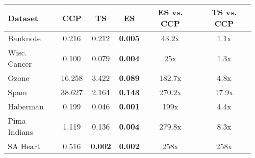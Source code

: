 \begin{tabular}{lccccc}
\toprule
Dataset & CCP & TS & ES & ES vs. CCP & TS vs. CCP \\
\midrule
Banknote & 0.216 & 0.212 & \textbf{0.005} & 43.2x & 1.1x \\
Wisc. Cancer & 0.100 & 0.079 & \textbf{0.004} & 25x & 1.3x \\
Ozone & 16.258 & 3.422 & \textbf{0.089} & 182.7x & 4.8x \\
Spam & 38.627 & 2.164 & \textbf{0.143} & 270.2x & 17.9x \\
Haberman & 0.199 & 0.046 & \textbf{0.001} & 199x & 4.4x \\
Pima Indians & 1.119 & 0.136 & \textbf{0.004} & 279.8x & 8.3x \\
SA Heart & 0.516 & \textbf{0.002} & \textbf{0.002} & 258x & 258x \\
\bottomrule
\end{tabular}